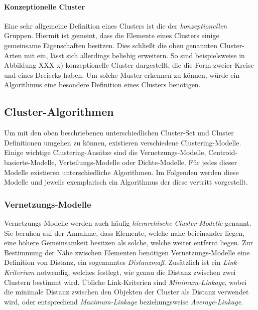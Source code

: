 \paragraph{Konzeptionelle Cluster}
Eine sehr allgemeine Definition eines Clusters ist die der \textit{konzeptionellen} Gruppen. Hiermit ist
gemeint, dass die Elemente eines Clusters einige gemeinsame Eigenschaften besitzen. Dies schließt die oben genannten
Cluster-Arten mit ein, lässt sich allerdings beliebig erweitern. So sind beispielsweise in Abbildung XXX x)
konzeptionelle Cluster dargestellt, die die Form zweier Kreise und eines Dreiecks haben. Um solche Muster
erkennen zu können, würde ein Algorithmus eine besondere Definition eines Clusters benötigen.



\subsection{Cluster-Algorithmen}
\label{sec:cluster_algos}

Um mit den oben beschriebenen unterschiedlichen Cluster-Set und Cluster Definitionen umgehen zu können,
existieren verschiedene Clustering-Modelle.
Einige wichtige Clustering-Ansätze sind die Vernetzungs-Modelle, Centroid-basierte-Modelle, Verteilungs-Modelle
oder Dichte-Modelle. Für jedes dieser Modelle existieren unterschiedliche Algorithmen. Im Folgenden werden
diese Modelle und jeweils exemplarisch ein Algorithmus der diese vertritt vorgestellt.  

\subsubsection{Vernetzungs-Modelle}

Vernetzungs-Modelle werden auch häufig \textit{hierarchische Cluster-Modelle} genannt. Sie beruhen auf
der Annahme, dass Elemente, welche nahe beieinander liegen, eine höhere Gemeinsamkeit besitzen als solche,
welche weiter entfernt liegen. Zur Bestimmung der Nähe zwischen Elementen benötigen Vernetzungs-Modelle eine
Definition von Distanz, ein sogenanntes \textit{Distanzmaß}. Zusätzlich ist ein \textit{Link-Kriterium} notwendig,
welches festlegt, wie genau die Distanz zwischen zwei Clustern bestimmt wird. Übliche Link-Kriterien
sind \textit{Minimum-Linkage}, wobei die minimale Distanz zwischen den Objekten der Cluster als Distanz verwendet wird,
oder entsprechend \textit{Maximum-Linkage} beziehungsweise \textit{Average-Linkage}. \cite[]{Jain1999, GeorgeSeif2018}

